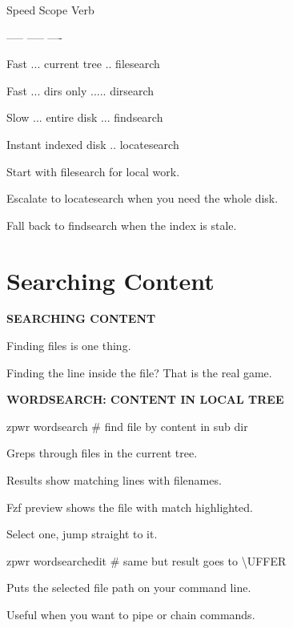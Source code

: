 \documentclass[11pt,a4paper,twoside]{book}
\begin{document}
Speed    Scope          Verb

-----    -----          ----

Fast ... current tree .. filesearch

Fast ... dirs only ..... dirsearch

Slow ... entire disk ... findsearch

Instant  indexed disk .. locatesearch

Start with filesearch for local work.

Escalate to locatesearch when you need the whole disk.

Fall back to findsearch when the index is stale.


\vspace{16pt}

\section{Searching Content}


\vspace{10pt}
{\large\bfseries\color{neoncyan} SEARCHING CONTENT}\vspace{6pt}

Finding files is one thing.

Finding the line inside the file? That is the real game.


\vspace{12pt}
{\bfseries\color{neonyellow} WORDSEARCH: CONTENT IN LOCAL TREE}\vspace{4pt}

\begin{codebox}
zpwr wordsearch          \# find file by content in sub dir\\
\end{codebox}

Greps through files in the current tree.

Results show matching lines with filenames.

Fzf preview shows the file with match highlighted.

Select one, jump straight to it.

\begin{codebox}
zpwr wordsearchedit      \# same but result goes to \textbackslash{}UFFER\\
\end{codebox}

Puts the selected file path on your command line.

Useful when you want to pipe or chain commands.
\end{document}
